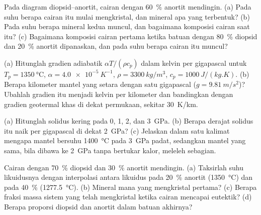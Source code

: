 \begin{exercise}[$\star$]\label{exo:b2:mantle-melting:2}
Pada diagram diopsid--anortit, cairan dengan \qty{60}{\percent} anortit
mendingin. (a) Pada suhu berapa cairan itu mulai mengkristal, dan mineral apa yang
terbentuk? (b) Pada suhu berapa mineral kedua muncul, dan bagaimana komposisi
cairan saat itu? (c) Bagaimana komposisi cairan pertama ketika
batuan dengan \qty{80}{\percent} diopsid dan \qty{20}{\percent} anortit dipanaskan,
dan pada suhu berapa cairan itu muncul?
\end{exercise}

\begin{exercise}[$\star$]\label{exo:b2:mantle-melting:3}
(a) Hitunglah gradien adiabatik $\alpha T/(\rho c_p)$ dalam kelvin per gigapascal
untuk $T_p = \qty{1350}{\celsius}$, $\alpha = \qty{4.0e-5}{K^{-1}}$, $\rho =
\qty{3300}{kg/m^3}$, $c_p = \qty{1000}{J/(kg.K)}$. (b) Berapa kilometer
mantel yang setara dengan satu gigapascal ($g = \qty{9.81}{m/s^2}$)? Ubahlah gradien itu menjadi kelvin
per kilometer dan bandingkan dengan gradien geotermal khas di dekat permukaan,
sekitar \qty{30}{K/km}.
\end{exercise}

\begin{exercise}[$\star$]\label{exo:b2:mantle-melting:4}
(a) Hitunglah solidus kering  pada 0, 1, 2, dan \qty{3}{GPa}. (b) Berapa
derajat solidus itu naik per gigapascal di dekat \qty{2}{GPa}? (c) Jelaskan dalam satu
kalimat mengapa mantel bersuhu \qty{1400}{\celsius} pada \qty{3}{GPa} padat, sedangkan
mantel yang sama, bila dibawa ke \qty{2}{GPa} tanpa bertukar kalor, meleleh sebagian.
\end{exercise}

\begin{exercise}[$\star\star$]\label{exo:b2:mantle-melting:5}
Cairan dengan \qty{70}{\percent} diopsid dan \qty{30}{\percent} anortit mendingin.
(a) Taksirlah suhu likuidusnya dengan interpolasi antara likuidus pada
\qty{20}{\percent} anortit (\qty{1350}{\celsius}) dan pada \qty{40}{\percent}
(\qty{1277.5}{\celsius}). (b) Mineral mana yang mengkristal pertama? (c) Berapa fraksi massa
sistem yang telah mengkristal ketika cairan mencapai eutektik?
(d) Berapa proporsi diopsid dan anortit dalam batuan akhirnya?
\end{exercise}

